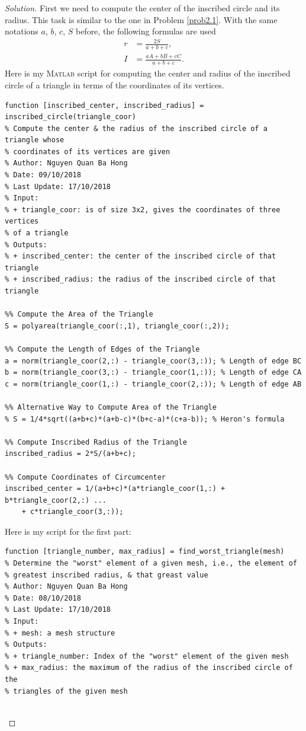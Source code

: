 \documentclass[11pt,a4paper,center,notitlepage]{article}
\numberwithin{equation}{section}
\begin{document}
\begin{proof}[Solution]
First we need to compute the center of the inscribed circle and its radius. This task is similar to the one in Problem \ref{prob2.1}. With the same notations $a$, $b$, $c$, $S$ before, the following formulas are used 
\begin{align}
r &= \frac{{2S}}{{a + b + c}},\\
I &= \frac{{aA + bB + cC}}{{a + b + c}}.
\end{align}
Here is my \textsc{Matlab} script for computing the center and radius of the inscribed circle of a triangle in terms of the coordinates of its vertices.
\begin{verbatim}
function [inscribed_center, inscribed_radius] = inscribed_circle(triangle_coor)
% Compute the center & the radius of the inscribed circle of a triangle whose
% coordinates of its vertices are given
% Author: Nguyen Quan Ba Hong
% Date: 09/10/2018
% Last Update: 17/10/2018
% Input:
% + triangle_coor: is of size 3x2, gives the coordinates of three vertices
% of a triangle
% Outputs:
% + inscribed_center: the center of the inscribed circle of that triangle
% + inscribed_radius: the radius of the inscribed circle of that triangle

%% Compute the Area of the Triangle
S = polyarea(triangle_coor(:,1), triangle_coor(:,2));

%% Compute the Length of Edges of the Triangle
a = norm(triangle_coor(2,:) - triangle_coor(3,:)); % Length of edge BC
b = norm(triangle_coor(3,:) - triangle_coor(1,:)); % Length of edge CA
c = norm(triangle_coor(1,:) - triangle_coor(2,:)); % Length of edge AB

%% Alternative Way to Compute Area of the Triangle
% S = 1/4*sqrt((a+b+c)*(a+b-c)*(b+c-a)*(c+a-b)); % Heron's formula

%% Compute Inscribed Radius of the Triangle
inscribed_radius = 2*S/(a+b+c);

%% Compute Coordinates of Circumcenter
inscribed_center = 1/(a+b+c)*(a*triangle_coor(1,:) + b*triangle_coor(2,:) ...
    + c*triangle_coor(3,:));
\end{verbatim}
Here is my script for the first part:
\begin{verbatim}
function [triangle_number, max_radius] = find_worst_triangle(mesh)
% Determine the "worst" element of a given mesh, i.e., the element of
% greatest inscribed radius, & that greast value
% Author: Nguyen Quan Ba Hong
% Date: 08/10/2018
% Last Update: 17/10/2018
% Input:
% + mesh: a mesh structure
% Outputs:
% + triangle_number: Index of the "worst" element of the given mesh
% + max_radius: the maximum of the radius of the inscribed circle of the
% triangles of the given mesh


\end{verbatim}
\end{proof}
\end{document}
